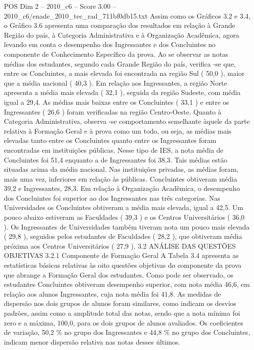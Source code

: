 \begin{textsample}{POS Dim 2 – 2010\_c6 – Score 3.00 – 2010\_c6/enade\_2010\_tec\_rad\_711bf0db15.txt}
Assim como os Gráficos 3.2 e 3.4, o Gráfico 3.6 apresenta uma comparação dos resultados em relação à Grande Região do país, à Categoria Administrativa e à Organização Acadêmica, agora levando em conta o desempenho dos Ingressantes e dos Concluintes no componente de Conhecimento Específico da prova.
Ao se observar as notas médias dos estudantes, segundo cada Grande Região do país, verifica -se que, entre os Concluintes, a mais elevada foi encontrada na região Sul ( 50,0 ), maior que a média nacional ( 40,3 ).
Em relação aos Ingressantes, a região Norte apresenta a média mais elevada ( 32,1 ), seguida da região Sudeste, com média igual a 29,4.
As médias mais baixas entre os Concluintes ( 33,1 ) e entre os Ingressantes ( 26,6 ) foram verificadas na região Centro-Oeste.
Quanto à Categoria Administrativa, observa -se comportamento semelhante àquele da parte relativa à Formação Geral e à prova como um todo, ou seja, as médias mais elevadas tanto entre os Concluintes quanto entre os Ingressantes foram encontradas em instituições públicas.
Nesse tipo de IES, a nota média de Concluintes foi 51,4 enquanto a de Ingressantes foi 38,3.
Tais médias estão situadas acima da média nacional.
Nas instituições privadas, as médias foram, mais uma vez, inferiores em relação às públicas.
Concluintes obtiveram média 39,2 e Ingressantes, 28,3.
Em relação à Organização Acadêmica, o desempenho dos Concluintes foi superior ao dos Ingressantes nas três categorias.
Nas Universidades os Concluintes obtiveram a média mais elevada, igual a 42,5.
Um pouco abaixo estiveram as Faculdades ( 39,3 ) e os Centros Universitários ( 36,0 ).
Os Ingressantes de Universidades também tiveram nota um pouco mais elevada ( 29,8 ), seguidos pelos estudantes de Faculdades ( 28,2 ), que obtiveram média próxima aos Centros Universitários ( 27,9 ). 3.2 ANÁLISE DAS QUESTÕES OBJETIVAS 3.2.1 Componente de Formação Geral A Tabela 3.4 apresenta as estatísticas básicas relativas às oito questões objetivas do componente da prova que abrange a Formação Geral dos estudantes.
Como pode ser observado, os estudantes Concluintes obtiveram desempenho superior, com nota média 46,6, em relação aos alunos Ingressantes, cuja nota média foi 41,8.
As medidas de dispersão nos dois grupos de alunos foram similares, como indicam os desvios padrões, assim como a amplitude total das notas, sendo que a nota mínima foi zero e a máxima, 100,0, para os dois grupos de alunos avaliados.
Os coeficientes de variação, 50,2 \% no grupo dos Ingressantes e 44,8 \% no grupo dos Concluintes, indicam menor dispersão relativa nas notas desses últimos.

\end{textsample}
